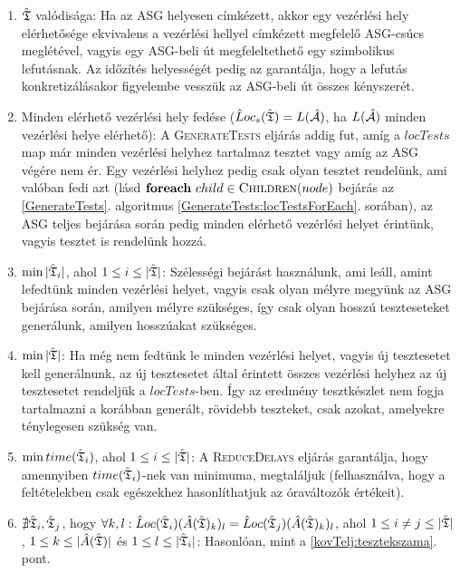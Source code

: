 \begin{enumerate}
    \item $\hat{\mathfrak{T}}$ valódisága: Ha az ASG helyesen címkézett, akkor egy vezérlési hely elérhetősége ekvivalens a vezérlési hellyel címkézett megfelelő ASG-csúcs meglétével, vagyis egy ASG-beli út megfeleltethető egy szimbolikus lefutásnak. Az időzítés helyességét pedig az garantálja, hogy a lefutás konkretizálásakor figyelembe vesszük az ASG-beli út összes kényszerét.
    \item Minden elérhető vezérlési hely fedése ($\hat{L}oc_s(\hat{\mathfrak{T}}) = L(\hat{\mathcal{A}})$, ha $L(\hat{\mathcal{A}})$ minden vezérlési helye elérhető): A \textsc{GenerateTests} eljárás addig fut, amíg a $locTests$ map már minden vezérlési helyhez tartalmaz tesztet vagy amíg az ASG végére nem ér. Egy vezérlési helyhez pedig csak olyan tesztet rendelünk, ami valóban fedi azt (lásd $\textbf{foreach}\ child \in \textsc{Children}(node)$ bejárás az \ref{GenerateTests}. algoritmus \ref{GenerateTests:locTestsForEach}. sorában), az ASG teljes bejárása során pedig minden elérhető vezérlési helyet érintünk, vagyis tesztet is rendelünk hozzá.
    \item $\min |\hat{\mathfrak{T}}_i|$, ahol $1 \leq i \leq |\hat{\mathfrak{T}}|$: Szélességi bejárást használunk, ami leáll, amint lefedtünk minden vezérlési helyet, vagyis csak olyan mélyre megyünk az ASG bejárása során, amilyen mélyre szükséges, így csak olyan hosszú teszteseteket generálunk, amilyen hosszúakat szükséges.
    \item $\min |\hat{\mathfrak{T}}|$: Ha még nem fedtünk le minden vezérlési helyet, vagyis új tesztesetet kell generálnunk, az új tesztesetet által érintett összes vezérlési helyhez az új tesztesetet rendeljük a $locTests$-ben. Így az eredmény tesztkészlet nem fogja tartalmazni a korábban generált, rövidebb teszteket, csak azokat, amelyekre ténylegesen szükség van. \label{kovTelj:tesztekszama}
    \item $\min time(\hat{\mathfrak{T}}_i)$, ahol $1 \leq i \leq |\hat{\mathfrak{T}}|$: A \textsc{ReduceDelays} eljárás garantálja, hogy amennyiben $time(\hat{\mathfrak{T}}_i)$-nek van minimuma, megtaláljuk (felhasználva, hogy a feltételekben csak egészekhez hasonlíthatjuk az óraváltozók értékeit).
    \item $\nexists \hat{\mathfrak{T}}_i, \hat{\mathfrak{T}}_j$, hogy $\forall k, l: \hat{L}oc(\hat{\mathfrak{T}}_i)(\hat{A}(\hat{\mathfrak{T}})_k)_l = \hat{L}oc(\hat{\mathfrak{T}}_j)(\hat{A}(\hat{\mathfrak{T}})_k)_l$, ahol $1 \leq i \neq j \leq |\hat{\mathfrak{T}}|$, $1 \leq k \leq |\hat{A}(\hat{\mathfrak{T}})|$ és $1 \leq l \leq |\hat{\mathfrak{T}}_i|$: Hasonlóan, mint a \ref{kovTelj:tesztekszama}. pont.
\end{enumerate}

